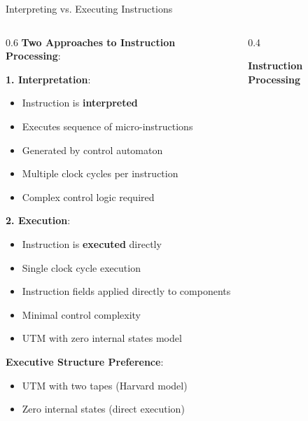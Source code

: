 \documentclass[aspectratio=169]{beamer}
\newcommand{\concept}[1]{\textbf{\color{darkblue}#1}}
\begin{document}
\begin{frame}{Interpreting vs. Executing Instructions}
\begin{columns}
\begin{column}{0.6\textwidth}
\concept{Two Approaches to Instruction Processing}:

\vspace{0.3cm}
\textbf{1. Interpretation}:
\begin{itemize}
\item Instruction is \textbf{interpreted}
\item Executes sequence of micro-instructions
\item Generated by control automaton
\item Multiple clock cycles per instruction
\item Complex control logic required
\end{itemize}

\vspace{0.3cm}
\textbf{2. Execution}:
\begin{itemize}
\item Instruction is \textbf{executed} directly
\item Single clock cycle execution
\item Instruction fields applied directly to components
\item Minimal control complexity
\item UTM with zero internal states model
\end{itemize}

\vspace{0.3cm}
\concept{Executive Structure Preference}:
\begin{itemize}
\item UTM with two tapes (Harvard model)
\item Zero internal states (direct execution)
\end{itemize}
\end{column}
\begin{column}{0.4\textwidth}
\begin{center}
\textbf{Instruction Processing}
\vspace{0.3cm}

\end{center}
\end{column}
\end{columns}
\end{frame}
\end{document}
